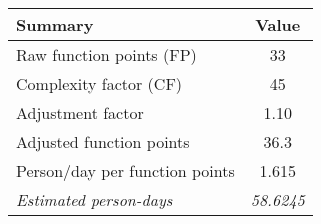 \begin{tabular}{l|c}
\textbf{Summary} & \textbf{Value} \\ \hline
Raw function points (FP) & 33 \\
Complexity factor (CF) & 45 \\
Adjustment factor & 1.10 \\
Adjusted function points & 36.3 \\
Person/day per function points & 1.615 \\ \hline
\textit{Estimated person-days} & \textit{58.6245}
\end{tabular}
